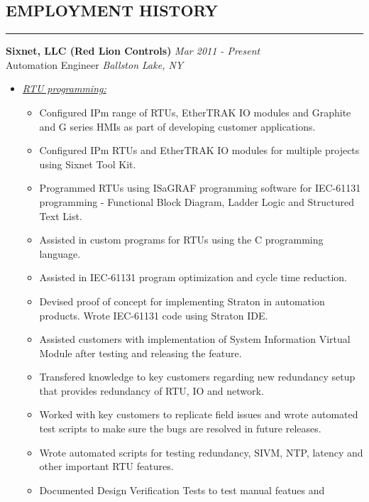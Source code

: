 \documentclass{article}
\begin{document}
\subsection*{\MakeUppercase{\bf Employment History}}
    \hrule
    \bigskip
    {\bf Sixnet, LLC (Red Lion Controls)} \hfill {\em Mar 2011 - Present} \\
    Automation Engineer \hfill {\em Ballston Lake, NY} \\
    \begin{itemize}
    \item \underline{\it RTU programming:}
          \begin{itemize}
          \item Configured IPm range of RTUs, EtherTRAK IO modules and Graphite
                and G series HMIs as part of developing customer applications.
          \item Configured IPm RTUs and EtherTRAK IO modules for multiple
                projects using Sixnet Tool Kit.
          \item Programmed RTUs using ISaGRAF programming software for IEC-61131
                programming - Functional Block Diagram, Ladder Logic and
                Structured Text List.
          \item Assisted in custom programs for RTUs using the C programming
                language.
          \item Assisted in IEC-61131 program optimization and cycle time
                reduction.
          \item Devised proof of concept for implementing Straton in automation
                products. Wrote IEC-61131 code using Straton IDE.
          \item Assisted customers with implementation of System Information
                Virtual Module after testing and releasing the feature.
          \item Transfered knowledge to key customers regarding new redundancy
                setup that provides redundancy of RTU, IO and network.
          \item Worked with key customers to replicate field issues and wrote
                automated test scripts to make sure the bugs are resolved in
                future releases.
          \item Wrote automated scripts for testing redundancy, SIVM, NTP,
                latency and other important RTU features.
          \item Documented Design Verification Tests to test manual featues and

\end{itemize}
\end{itemize}
\end{document}

